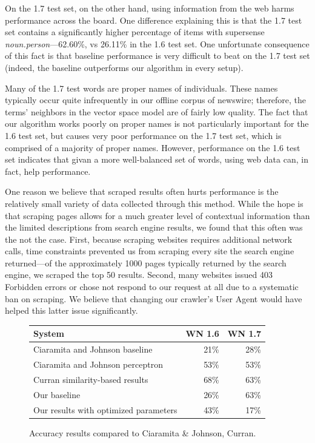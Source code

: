 \documentclass{article}
\begin{document}
On the 1.7 test set, on the other hand, using information from the web harms performance across the board.
One difference explaining this is that the 1.7 test set contains a significantly higher percentage of items with supersense {\it noun.person}---62.60\%, vs 26.11\% in the 1.6 test set.
One unfortunate consequence of this fact is that baseline performance is very difficult to beat on the 1.7 test set (indeed, the baseline outperforms our algorithm in every setup).

Many of the 1.7 test words are proper names of individuals.
These names typically occur quite infrequently in our offline corpus of newswire; therefore, the terms' neighbors in the vector space model are of fairly low quality.
The fact that our algorithm works poorly on proper names is not particularly important for the 1.6 test set, but causes very poor performance on the 1.7 test set, which is comprised of a majority of proper names.
However, performance on the 1.6 test set indicates that givan a more well-balanced set of words, using web data can, in fact, help performance.

One reason we believe that scraped results often hurts performance is the relatively small variety of data collected through this method.
While the hope is that scraping pages allows for a much greater level of contextual information than the limited descriptions from search engine results, we found that this often was the not the case.
First, because scraping websites requires additional network calls, time constraints prevented us from scraping every site the search engine returned---of the approximately 1000 pages typically returned by the search engine, we scraped the top 50 results.
Second, many websites issued 403 Forbidden errors or chose not respond to our request at all due to a systematic ban on scraping.
We believe that changing our crawler's User Agent would have helped this latter issue significantly.

\begin{figure}[hbtp]
\begin{center}
\begin{tabular}{|l|r|r|}
    \hline
    \bf{System} & \bf{WN 1.6} & \bf{WN 1.7}\\
    \hline
    \hline
    Ciaramita and Johnson baseline & 21\% & 28\%\\
    Ciaramita and Johnson perceptron & 53\% & 53\%\\
    Curran similarity-based results & 68\% & 63\%\\
    \hline
    Our baseline & 26\% & 63\%\\
    Our results with optimized parameters & 43\% & 17\%\\
    \hline
\end{tabular}
\caption{Accuracy results compared to Ciaramita \& Johnson, Curran.}
\label{fig:compareresults}
\end{center}
\end{figure}
\end{document}
